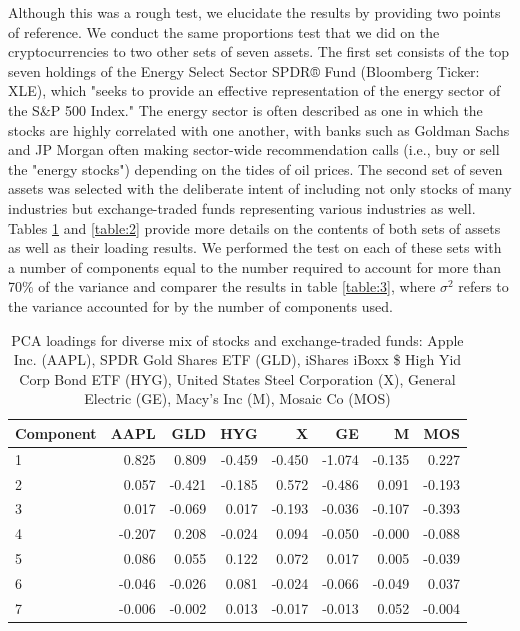 \documentclass[12pt,twoside]{article}
\begin{document}
Although this was a rough test, we elucidate the results by providing two points of reference. We conduct the same proportions test that we did on the cryptocurrencies to two other sets of seven assets. The first set consists of the top seven holdings of the Energy Select Sector SPDR® Fund (Bloomberg Ticker: XLE), which "seeks to provide an effective representation of the energy sector of the S\&P 500 Index." The energy sector is often described as one in which the stocks are highly correlated with one another, with banks such as Goldman Sachs and JP Morgan often making sector-wide recommendation calls (i.e., buy or sell the "energy stocks") depending on the tides of oil prices. The second set of seven assets was selected with the deliberate intent of including not only stocks of many industries but exchange-traded funds representing various industries as well. Tables \ref{table:1} and \ref{table:2} provide more details on the contents of both sets of assets as well as their loading results. We performed the test on each of these sets with a number of components equal to the number required to account for more than 70\% of the variance and comparer the results in table \ref{table:3}, where $\sigma^2$ refers to the variance accounted for by the number of components used.
\bigbreak

\begin{table}[h!]
	\centering
\begin{tabular}{lrrrrrrr}
	\toprule
Component &   AAPL &    GLD &    HYG &      X &     GE &      M &    MOS \\
\midrule
1         &  0.825 &  0.809 & -0.459 & -0.450 & -1.074 & -0.135 &  0.227 \\
2         &  0.057 & -0.421 & -0.185 &  0.572 & -0.486 &  0.091 & -0.193 \\
3         &  0.017 & -0.069 &  0.017 & -0.193 & -0.036 & -0.107 & -0.393 \\
4         & -0.207 &  0.208 & -0.024 &  0.094 & -0.050 & -0.000 & -0.088 \\
5         &  0.086 &  0.055 &  0.122 &  0.072 &  0.017 &  0.005 & -0.039 \\
6         & -0.046 & -0.026 &  0.081 & -0.024 & -0.066 & -0.049 &  0.037 \\
7         & -0.006 & -0.002 &  0.013 & -0.017 & -0.013 &  0.052 & -0.004 \\
	\bottomrule
\end{tabular}
\caption{PCA loadings for diverse mix of stocks and exchange-traded funds: Apple Inc. (AAPL), SPDR Gold Shares ETF (GLD),  iShares iBoxx \$ High Yid Corp Bond ETF (HYG), United States Steel Corporation (X), General Electric (GE), Macy's Inc (M), Mosaic Co (MOS) }
\label{table:1}
\end{table}
\end{document}
